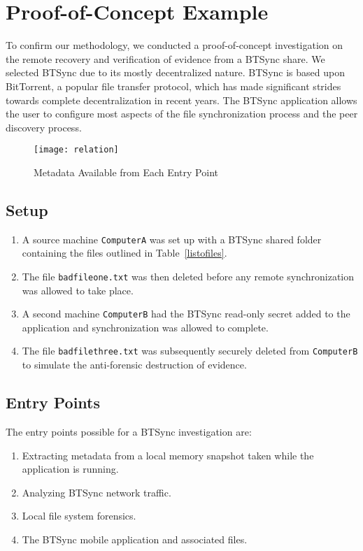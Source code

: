 \documentclass{jdfsl}
\begin{document}
\section{Proof-of-Concept Example}

To confirm our methodology, we conducted a proof-of-concept investigation on the remote recovery and verification of evidence from a BTSync share. We selected BTSync due to its mostly decentralized nature. BTSync is based upon BitTorrent, a popular file transfer protocol, which has made significant strides towards complete decentralization in recent years. The BTSync application allows the user to configure most aspects of the file synchronization process and the peer discovery process. \\


\begin{figure*}[!thbp]
\centering
\texttt{[image: relation]}
\caption{Metadata Available from Each Entry Point}
\label{fig:POC}
\end{figure*}

\subsection{Setup}

\begin{enumerate}
\item A source machine \texttt{ComputerA} was set up with a BTSync shared folder containing the files outlined in Table~\ref{listofiles}. 
\item The file \texttt{badfileone.txt} was then deleted before any remote synchronization was allowed to take place. 
\item A second machine \texttt{ComputerB} had the BTSync read-only secret added to the application and synchronization was allowed to complete. 
\item The file \texttt{badfilethree.txt} was subsequently securely deleted from \texttt{ComputerB} to simulate the anti-forensic destruction of evidence.
\end{enumerate}

\subsection{Entry Points}
\label{POC:Entry}
The entry points possible for a BTSync investigation are:
\begin{enumerate}
\item Extracting metadata from a local memory snapshot taken while the application is running.
\item Analyzing BTSync network traffic.
\item Local file system forensics.
\item The BTSync mobile application and associated files.
\end{enumerate}
\end{document}
